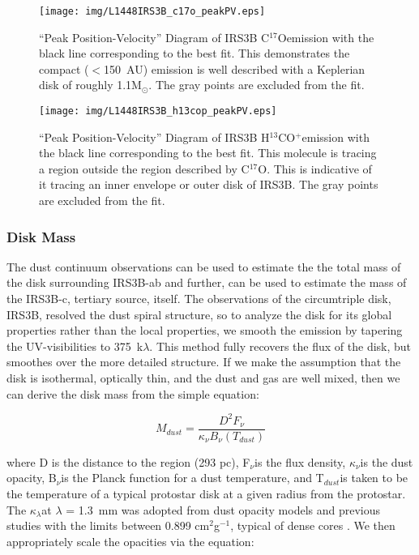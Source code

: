 \documentclass[preprint,12pt]{aastex62}
\newcommand{\cso}{C$^{17}$O}
\newcommand{\htcop}{H$^{13}$CO$^+$}
\newcommand{\solm}{M$_{\odot}$}
\begin{document}
\begin{figure}[H]
\begin{center}
\texttt{[image: img/L1448IRS3B\_c17o\_peakPV.eps]}
\end{center}
\caption{``Peak Position-Velocity'' Diagram of IRS3B \cso\space emission with the black line corresponding to the best fit. This demonstrates the compact ($<$150~AU) emission is well described with a Keplerian disk of roughly 1.1\solm. The gray points are excluded from the fit.}\label{fig:peakpvc17o}
\end{figure}
\begin{figure}[H]
\begin{center}
\texttt{[image: img/L1448IRS3B\_h13cop\_peakPV.eps]}
\end{center}
\caption{``Peak Position-Velocity'' Diagram of IRS3B \htcop\space emission with the black line corresponding to the best fit. This molecule is tracing a region outside the region described by \cso. This is indicative of it tracing an inner envelope or outer disk of IRS3B. The gray points are excluded from the fit.}\label{fig:peakpvh13cop}
\end{figure}


\subsubsection{Disk Mass}\label{sec:surfden}
The dust continuum observations can be used to estimate the the total mass of the disk surrounding IRS3B-ab and further, can be used to estimate the mass of the IRS3B-c, tertiary source, itself. The observations of the circumtriple disk, IRS3B, resolved the dust spiral structure, so to analyze the disk for its global properties rather than the local properties, we smooth the emission by tapering the UV-visibilities to 375~k$\lambda$. This method fully recovers the flux of the disk, but smoothes over the more detailed structure. If we make the assumption that the disk is isothermal, optically thin, and the dust and gas are well mixed, then we can derive the disk mass from the simple equation:

\begin{equation}
    M_{dust} = \frac{D^2 F_{\nu}}{\kappa_{\nu}B_{\nu}(T_{dust})}
\end{equation}

where D is the distance to the region (293 pc), F$_{\nu}$\space is the flux density, $\kappa_{\nu}$\space is the dust opacity, B$_{\nu}$\space is the Planck function for a dust temperature, and T$_{dust}$\space is taken to be the temperature of a typical protostar disk at a given radius from the protostar. The $\kappa_{\lambda}$\space at $\lambda$ = 1.3~mm was adopted from dust opacity models and previous studies with the limits between 0.899 cm$^2$g$^{-1}$, typical of dense cores \citep{1994AA...291..943O}. We then appropriately scale the opacities via the equation:
\end{document}

